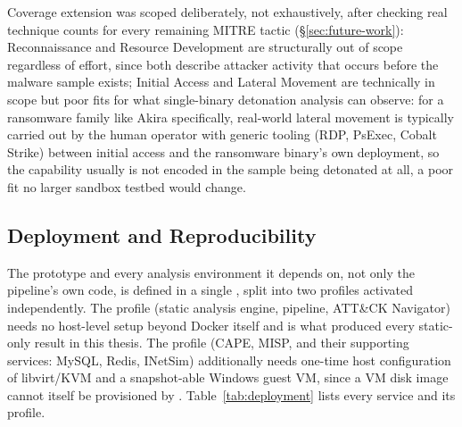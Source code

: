 Coverage extension was scoped deliberately, not exhaustively, after
checking real technique counts for every remaining MITRE tactic
(\S\ref{sec:future-work}): Reconnaissance and Resource Development are
structurally out of scope regardless of effort, since both describe
attacker activity that occurs before the malware sample exists;
Initial Access and Lateral Movement are technically in scope but poor
fits for what single-binary detonation analysis can observe: for a
ransomware family like Akira specifically, real-world lateral movement
is typically carried out by the human operator with generic tooling
(RDP, PsExec, Cobalt Strike) between initial access and the ransomware
binary's own deployment, so the capability usually is not encoded in
the sample being detonated at all, a poor fit no larger sandbox
testbed would change.

\subsection{Deployment and Reproducibility}
\label{sec:deployment}

The prototype and every analysis environment it depends on, not only
the pipeline's own code, is defined in a single ,
split into two profiles activated independently. The 
profile (static analysis engine, pipeline, ATT\&CK Navigator) needs no
host-level setup beyond Docker itself and is what produced every
static-only result in this thesis. The  profile (CAPE,
MISP, and their supporting services: MySQL, Redis, INetSim)
additionally needs one-time host configuration of libvirt/KVM and a
snapshot-able Windows guest VM, since a VM disk image cannot itself be
provisioned by . Table~\ref{tab:deployment} lists
every service and its profile.

